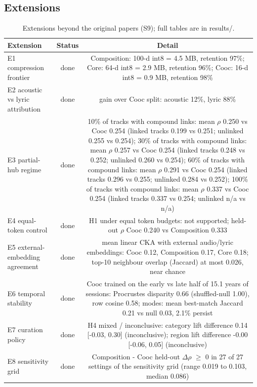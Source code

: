 \documentclass[11pt,a4paper]{article}
\begin{document}
\subsection*{Extensions}
\begin{table}[h]\centering\small
\begin{tabular}{lcc}
\toprule
\textbf{Extension} & \textbf{Status} & \textbf{Detail} \\
\midrule
E1 compression frontier & done & Composition: 100-d int8 = 4.5 MB, retention 97\%; Core: 64-d int8 = 2.9 MB, retention 96\%; Cooc: 16-d int8 = 0.9 MB, retention 98\% \\
E2 acoustic vs lyric attribution & done & gain over Cooc split: acoustic 12\%, lyric 88\% \\
E3 partial-hub regime & done & 10\% of tracks with compound links: mean $\rho$ 0.250 vs Cooc 0.254 (linked tracks 0.199 vs 0.251; unlinked 0.255 vs 0.254); 30\% of tracks with compound links: mean $\rho$ 0.257 vs Cooc 0.254 (linked tracks 0.248 vs 0.252; unlinked 0.260 vs 0.254); 60\% of tracks with compound links: mean $\rho$ 0.291 vs Cooc 0.254 (linked tracks 0.296 vs 0.255; unlinked 0.284 vs 0.252); 100\% of tracks with compound links: mean $\rho$ 0.337 vs Cooc 0.254 (linked tracks 0.337 vs 0.254; unlinked n/a vs n/a) \\
E4 equal-token control & done & H1 under equal token budgets: not supported; held-out $\rho$ Cooc 0.240 vs Composition 0.333 \\
E5 external-embedding agreement & done & mean linear CKA with external audio/lyric embeddings: Cooc 0.12, Composition 0.17, Core 0.18; top-10 neighbour overlap (Jaccard) at most 0.026, near chance \\
E6 temporal stability & done & Cooc trained on the early vs late half of 15.1 years of sessions: Procrustes disparity 0.66 (shuffled-null 1.00), row cosine 0.58; modes: mean best-match Jaccard 0.21 vs null 0.03, 2.1\% persist \\
E7 curation policy & done & H4 mixed / inconclusive: category lift difference 0.14 [-0.03, 0.30] (inconclusive); region lift difference -0.00 [-0.06, 0.05] (inconclusive) \\
E8 sensitivity grid & done & Composition - Cooc held-out $\Delta$$\rho$ $\geq$ 0 in 27 of 27 settings of the sensitivity grid (range 0.019 to 0.103, median 0.086) \\
\bottomrule
\end{tabular}
\caption{Extensions beyond the original papers (S9); full tables are in results/.}
\end{table}
\end{document}
